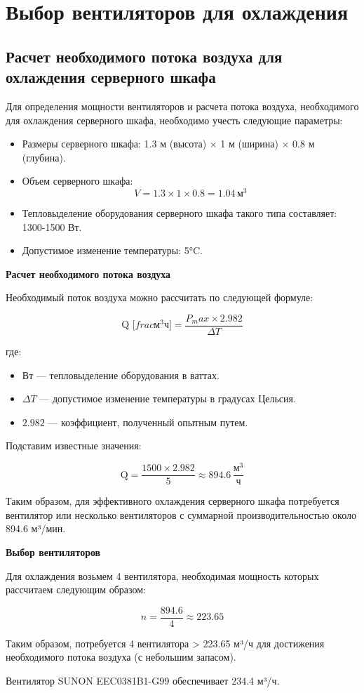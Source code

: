 \chapter {Выбор вентиляторов для охлаждения}

\section{Расчет необходимого потока воздуха для охлаждения серверного шкафа}

Для определения мощности вентиляторов и расчета потока воздуха, необходимого для охлаждения серверного шкафа, необходимо учесть следующие параметры:

\begin{itemize}
    \item Размеры серверного шкафа: 1.3 м (высота) $\times$ 1 м (ширина) $\times$ 0.8 м (глубина).
    \item Объем серверного шкафа: 
    \[
    V = 1.3 \times 1 \times 0.8 = 1.04 \, \text{м}^3
    \]
    \item Тепловыделение оборудования серверного шкафа такого типа составляет: 1300-1500 Вт.
    \item Допустимое изменение температуры: 5°C.
\end{itemize}

\textbf{Расчет необходимого потока воздуха}

Необходимый поток воздуха можно рассчитать по следующей формуле:

\[
\text{Q [}frac{\text{м}^3}{\text{ч}}\text{]} = \frac{P_max \times 2.982}{\Delta T}
\]

где:
\begin{itemize}
    \item Вт — тепловыделение оборудования в ваттах.
    \item $\Delta T$ — допустимое изменение температуры в градусах Цельсия.
    \item $2.982$ — коэффициент, полученный опытным путем.
\end{itemize}

Подставим известные значения:

\[
\text{Q} = \frac{1500 \times 2.982}{5} \approx 894.6 \, \frac{\text{м}^3}{\text{ч}}
\]

Таким образом, для эффективного охлаждения серверного шкафа потребуется вентилятор или несколько вентиляторов с суммарной производительностью около 894.6 м³/мин.

\textbf{Выбор вентиляторов}

Для охлаждения возьмем 4 вентилятора, необходимая мощность которых рассчитаем следующим образом:

\[
 n = \frac{894.6}{4} \approx 223.65
\]

Таким образом, потребуется 4 вентилятора > 223.65 м³/ч для достижения необходимого потока воздуха (с небольшим запасом).

Вентилятор SUNON EEC0381B1-G99 обеспечивает 234.4 м³/ч.

